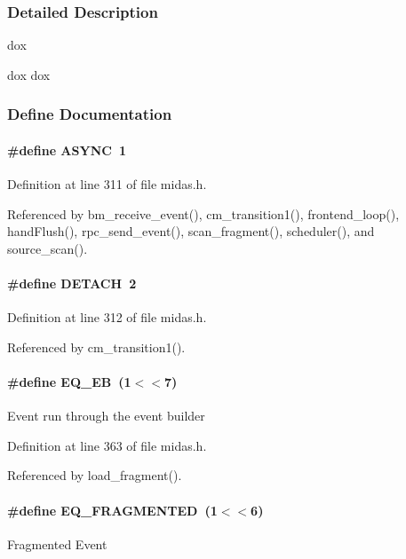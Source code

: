 \subsubsection{Detailed Description}
dox

dox dox 

\subsubsection{Define Documentation}
\paragraph[{ASYNC}]{\setlength{\rightskip}{0pt plus 5cm}\#define ASYNC~1}\hfill\label{group__mdefineh_gad28b60868b6548c43e7a18f30c9b2022}


Definition at line 311 of file midas.h.

Referenced by bm\_\-receive\_\-event(), cm\_\-transition1(), frontend\_\-loop(), handFlush(), rpc\_\-send\_\-event(), scan\_\-fragment(), scheduler(), and source\_\-scan().
\paragraph[{DETACH}]{\setlength{\rightskip}{0pt plus 5cm}\#define DETACH~2}\hfill\label{group__mdefineh_ga8d08c8624a47f26429c55440f93f0d9d}


Definition at line 312 of file midas.h.

Referenced by cm\_\-transition1().
\paragraph[{EQ\_\-EB}]{\setlength{\rightskip}{0pt plus 5cm}\#define EQ\_\-EB~(1$<$$<$7)}\hfill\label{group__mdefineh_ga28055cb167765a3f23ac9ef55afb8e26}
Event run through the event builder 

Definition at line 363 of file midas.h.

Referenced by load\_\-fragment().
\paragraph[{EQ\_\-FRAGMENTED}]{\setlength{\rightskip}{0pt plus 5cm}\#define EQ\_\-FRAGMENTED~(1$<$$<$6)}\hfill\label{group__mdefineh_ga702ba5dcc4b9f1ccf9a1a37bad62266e}
Fragmented Event 

